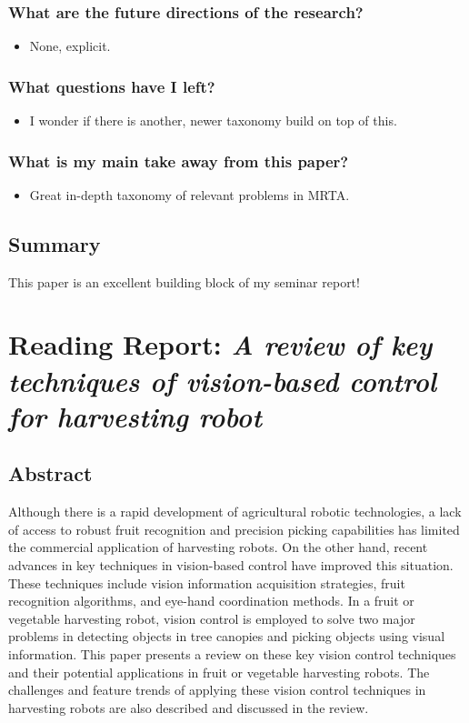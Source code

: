     \subsubsection*{What are the future directions of the research?}
    \begin{itemize}
        \item None, explicit. 
    \end{itemize}
    \subsubsection*{What questions have I left?}
    \begin{itemize}
        \item I wonder if there is another, newer taxonomy build on top of this.
    \end{itemize}
    \subsubsection*{What is my main take away from this paper?}
    \begin{itemize}
        \item Great in-depth taxonomy of relevant problems in MRTA.
    \end{itemize}
    
    \subsection*{Summary}
    This paper is an excellent building block of my seminar report!

    \newpage
    
    
    \section{Reading Report: \emph{A review of key techniques of vision-based control for harvesting robot}}
    \label{sec:Zhao2016}
    \cite{Zhao2016}
    
    \subsection*{Abstract}
    Although there is a rapid development of agricultural robotic technologies, a lack of access to robust fruit
    recognition and precision picking capabilities has limited the commercial application of harvesting
    robots. On the other hand, recent advances in key techniques in vision-based control have improved this
    situation. These techniques include vision information acquisition strategies, fruit recognition algorithms, and eye-hand coordination methods. In a fruit or vegetable harvesting robot, vision control is
    employed to solve two major problems in detecting objects in tree canopies and picking objects using
    visual information. This paper presents a review on these key vision control techniques and their potential applications in fruit or vegetable harvesting robots. The challenges and feature trends of applying
    these vision control techniques in harvesting robots are also described and discussed in the review.
    
